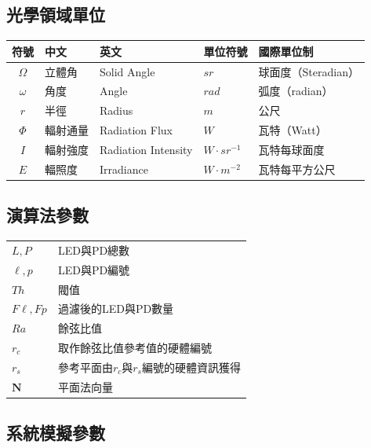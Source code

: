 \onehalfspacing

\subsection*{光學領域單位}

\begin{longtable}[l]{cllll}
    符號& 中文& 英文 & 單位符號&國際單位制\\\hline
    $\Omega$ & 立體角&Solid Angle& $sr$&球面度（Steradian） \\
    $\omega$ & 角度&Angle& $rad$&弧度（radian）\\
    $r$ & 半徑&Radius&  $m$ &公尺\\
    $\Phi$ & 輻射通量&Radiation Flux& $W$&瓦特（Watt）\\
    $I$ & 輻射強度&Radiation Intensity & $W\cdot sr^{-1}$&瓦特每球面度 \\
    $E$ & 輻照度&Irradiance&$W\cdot m^{-2}$ &瓦特每平方公尺\\
\end{longtable}


\onehalfspacing

\subsection*{演算法參數}

\begin{longtable}[l]{ll}
    $L,P$ & LED與PD總數\\
    $\ell,p$ & LED與PD編號\\
    $Th$& 閥值\\
    $F\ell,Fp$ & 過濾後的LED與PD數量\\
    $Ra$& 餘弦比值\\
    $r_c$& 取作餘弦比值參考值的硬體編號\\
    $r_s$& 參考平面由$r_c$與$r_s$編號的硬體資訊獲得\\
    $\boldsymbol{N}$& 平面法向量\\
\end{longtable}

\onehalfspacing

\subsection*{系統模擬參數}

